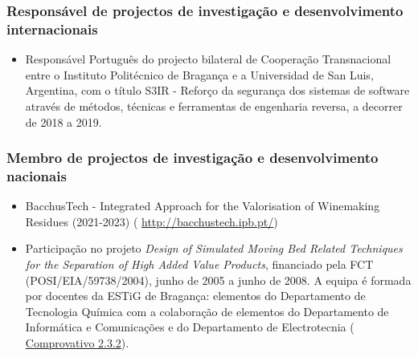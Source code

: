 \documentclass[11pt]{article}
\begin{document}
\subsubsection{Responsável de projectos de investigação e desenvolvimento internacionais}
\begin{itemize}
\item{Responsável Português do projecto bilateral de Cooperação Transnacional entre o Instituto Politécnico de Bragança e a Universidad de San Luis, Argentina, com o título S3IR - Reforço da segurança dos sistemas de software através de métodos, técnicas e ferramentas de engenharia reversa, a decorrer de 2018 a 2019.}
\end{itemize}
\subsubsection{Membro de projectos de investigação e desenvolvimento nacionais}
\begin{itemize}
\item{BacchusTech - Integrated Approach for the Valorisation of Winemaking Residues (2021-2023) (
\url{http://bacchustech.ipb.pt/})}
\item{Participação no projeto {
\em{ Design of Simulated Moving Bed Related Techniques for the Separation of High Added Value Products}}, financiado pela FCT (POSI/EIA/59738/2004), junho de 2005 a junho de 2008. A equipa é formada por docentes da ESTiG de Bragança: elementos do Departamento de Tecnologia Química com a colaboração de elementos do Departamento de Informática e Comunicações e do Departamento de Electrotecnia (
\href{run:Projectos/ComprovativoDSMBRT.pdf}{Comprovativo 2.3.2}).}
\end{itemize}
\end{document}
